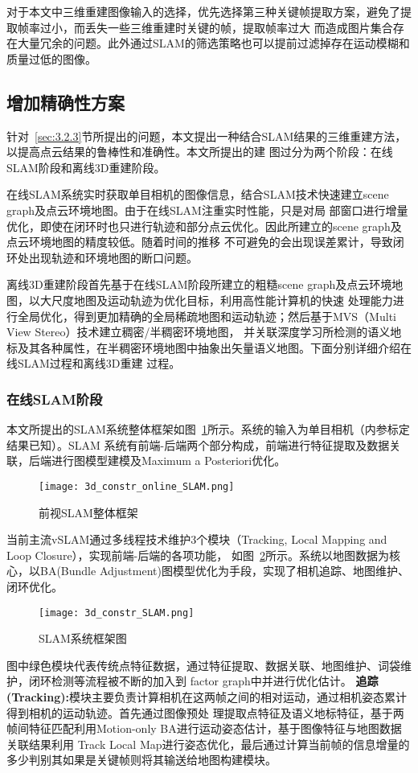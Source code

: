 对于本文中三维重建图像输入的选择，优先选择第三种关键帧提取方案，避免了提取帧率过小，而丢失一些三维重建时关键的帧，提取帧率过大
而造成图片集合存在大量冗余的问题。此外通过SLAM的筛选策略也可以提前过滤掉存在运动模糊和质量过低的图像。
\subsection{增加精确性方案}
\label{sec:3.3.3}
针对~\ref{sec:3.2.3}节所提出的问题，本文提出一种结合SLAM结果的三维重建方法，以提高点云结果的鲁棒性和准确性。本文所提出的建
图过分为两个阶段：在线SLAM阶段和离线3D重建阶段。

在线SLAM系统实时获取单目相机的图像信息，结合SLAM技术快速建立scene graph及点云环境地图。由于在线SLAM注重实时性能，只是对局
部窗口进行增量优化，即使在闭环时也只进行轨迹和部分点云优化。因此所建立的scene graph及点云环境地图的精度较低。随着时间的推移
不可避免的会出现误差累计，导致闭环处出现轨迹和环境地图的断口问题。

离线3D重建阶段首先基于在线SLAM阶段所建立的粗糙scene graph及点云环境地图，以大尺度地图及运动轨迹为优化目标，利用高性能计算机的快速
处理能力进行全局优化，得到更加精确的全局稀疏地图和运动轨迹；然后基于MVS（Multi View Stereo）技术建立稠密/半稠密环境地图，
并关联深度学习所检测的语义地标及其各种属性，在半稠密环境地图中抽象出矢量语义地图。下面分别详细介绍在线SLAM过程和离线3D重建
过程。
\subsubsection{在线SLAM阶段}
\label{sec:3.3.3.1}
本文所提出的SLAM系统整体框架如图~\ref{fig:3d_constr_online_SLAM.png}所示。系统的输入为单目相机（内参标定结果已知）。SLAM
系统有前端-后端两个部分构成，前端进行特征提取及数据关联，后端进行图模型建模及Maximum a Posteriori优化。
\begin{figure}[H] %
  \centering
  \texttt{[image: 3d\_constr\_online\_SLAM.png]}
  \caption{前视SLAM整体框架}
  \label{fig:3d_constr_online_SLAM.png}
\end{figure}
当前主流vSLAM通过多线程技术维护3个模块（Tracking, Local Mapping and Loop Closure），实现前端-后端的各项功能，
如图~\ref{fig:3d_constr_SLAM}所示。系统以地图数据为核心，以BA(Bundle Adjustment)图模型优化为手段，实现了相机追踪、地图维护、
闭环优化。
\begin{figure}[H] %
  \centering
  \texttt{[image: 3d\_constr\_SLAM.png]}
  \caption{SLAM系统框架图}
  \label{fig:3d_constr_SLAM}
\end{figure}
图中绿色模块代表传统点特征数据，通过特征提取、数据关联、地图维护、词袋维护，闭环检测等流程被不断的加入到
factor graph中并进行优化估计。
\textbf{追踪(Tracking):}模块主要负责计算相机在这两帧之间的相对运动，通过相机姿态累计得到相机的运动轨迹。首先通过图像预处
理提取点特征及语义地标特征，基于两帧间特征匹配利用Motion-only BA进行运动姿态估计，基于图像特征与地图数据关联结果利用
Track Local Map进行姿态优化，最后通过计算当前帧的信息增量的多少判别其如果是关键帧则将其输送给地图构建模块。

